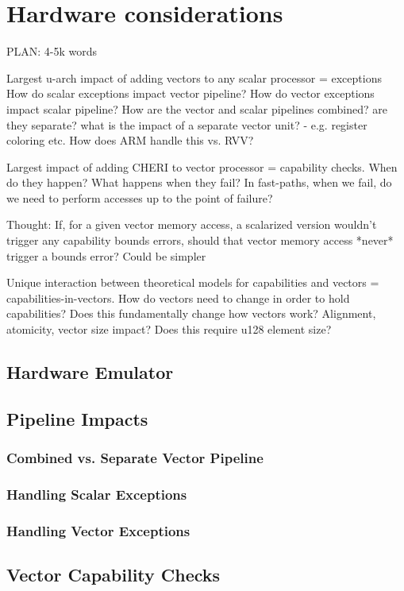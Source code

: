 \chapter{Hardware considerations}
PLAN: 4-5k words


Largest u-arch impact of adding vectors to any scalar processor = exceptions
How do scalar exceptions impact vector pipeline?
How do vector exceptions impact scalar pipeline?
How are the vector and scalar pipelines combined? are they separate? what is the impact of a separate vector unit?
- e.g. register coloring etc.
How does ARM handle this vs. RVV?

Largest impact of adding CHERI to vector processor = capability checks.
When do they happen?
What happens when they fail?
    In fast-paths, when we fail, do we need to perform accesses up to the point of failure?

Thought: If, for a given vector memory access, a scalarized version wouldn't trigger any capability bounds errors, should that vector memory access *never* trigger a bounds error?
Could be simpler

Unique interaction between theoretical models for capabilities and vectors = capabilities-in-vectors.
How do vectors need to change in order to hold capabilities?
Does this fundamentally change how vectors work?
Alignment, atomicity, vector size impact?
Does this require u128 element size?

\section{Hardware Emulator}

\section{Pipeline Impacts}
\subsection{Combined vs. Separate Vector Pipeline}
\subsection{Handling Scalar Exceptions}
\subsection{Handling Vector Exceptions}

\section{Vector Capability Checks}

